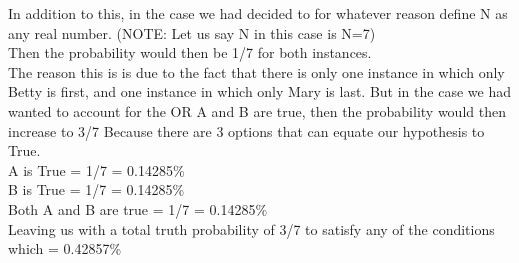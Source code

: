   In addition to this, in the case we had decided to for whatever reason define N as any real number. (NOTE: Let us say N in this case is N=7) \\
  
  Then the probability would then be 1/7 for both instances. \\
  
  The reason this is is due to the fact that there is only one instance in which only Betty is first, and one instance in which only Mary is last. But in the case we had wanted to account for the OR A and B are true, then the probability would then increase to 3/7 Because there are 3 options that can equate our hypothesis to True. \\
  
  A is True = 1/7 = 0.14285\% \\
  
  B is True = 1/7 = 0.14285\% \\
  
  Both A and B are true = 1/7 = 0.14285\% \\
  
  Leaving us with a total truth probability of 3/7 to satisfy any of the conditions which = 0.42857\% \\
  
  
\\\\
  \newpage

